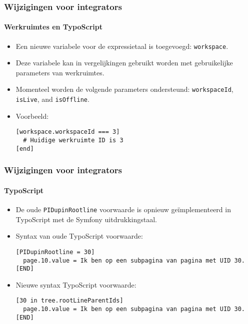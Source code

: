 \begin{frame}[fragile]
	\frametitle{Wijzigingen voor integrators}
	\framesubtitle{Werkruimtes en TypoScript}

	\lstset{basicstyle=\smaller\ttfamily}

	\begin{itemize}
		\item Een nieuwe variabele voor de expressietaal is toegevoegd: \texttt{workspace}.
		\item Deze variabele kan in vergelijkingen gebruikt worden met gebruikelijke parameters van werkruimtes.
		\item Momenteel worden de volgende parameters ondersteund:\newline
			\small
				\texttt{workspaceId}, \texttt{isLive}, and \texttt{isOffline}.
			\normalsize
		\item Voorbeeld:

\vspace{-0.4cm}
\begin{lstlisting}
[workspace.workspaceId === 3]
  # Huidige werkruimte ID is 3
[end]
\end{lstlisting}

	\end{itemize}

\end{frame}


\begin{frame}[fragile]
	\frametitle{Wijzigingen voor integrators}
	\framesubtitle{TypoScript}

	\lstset{basicstyle=\smaller\ttfamily}

	\begin{itemize}
		\item De oude \texttt{PIDupinRootline} voorwaarde is opnieuw geïmplementeerd
			in TypoScript met de Symfony uitdrukkingstaal.
		\item Syntax van oude TypoScript voorwaarde:

\vspace{-0.4cm}
\begin{lstlisting}
[PIDupinRootline = 30]
  page.10.value = Ik ben op een subpagina van pagina met UID 30.
[END]
\end{lstlisting}

		\item Nieuwe syntax TypoScript voorwaarde:

\vspace{-0.4cm}
\begin{lstlisting}
[30 in tree.rootLineParentIds]
  page.10.value = Ik ben op een subpagina van pagina met UID 30.
[END]
\end{lstlisting}

	\end{itemize}

\end{frame}

